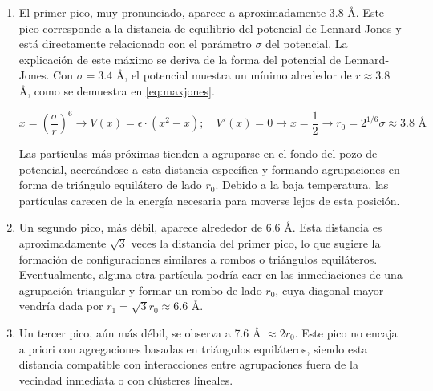 \begin{enumerate}
	
\item El primer pico, muy pronunciado, aparece a aproximadamente 3.8 Å. Este pico corresponde a la distancia de equilibrio del potencial de Lennard-Jones y está directamente relacionado con el parámetro $\sigma$ del potencial. La explicación de este máximo se deriva de la forma del potencial de Lennard-Jones. Con $\sigma=3.4$ Å, el potencial muestra un mínimo alrededor de $r \approx 3.8$ Å, como se demuestra en \ref{eq:maxjones}.
	
\begin{equation} \label{eq:maxjones}
		x = \left(\frac{\sigma}{r}\right)^{6} \rightarrow V(x) = \epsilon\cdot(x^2-x); \quad V'(x) = 0 \rightarrow x=\frac{1}{2} \rightarrow r_0=2^{1/6}\sigma \approx 3.8 \text{ Å}  
\end{equation}
	
Las partículas más próximas tienden a agruparse en el fondo del pozo de potencial, acercándose a esta distancia específica y formando agrupaciones en forma de triángulo equilátero de lado $r_0$. Debido a la baja temperatura, las partículas carecen de la energía necesaria para moverse lejos de esta posición.
	
\item Un segundo pico, más débil, aparece alrededor de 6.6 Å. Esta distancia es aproximadamente $\sqrt{3}$ veces la distancia del primer pico, lo que sugiere la formación de configuraciones similares a rombos o triángulos equiláteros. Eventualmente, alguna otra partícula podría caer en las inmediaciones de una agrupación triangular y formar un rombo de lado $r_0$, cuya diagonal mayor vendría dada por $r_1=\sqrt{3}r_0\approx 6.6$ Å.
	
\item Un tercer pico, aún más débil, se observa a 7.6 Å $\approx 2r_0$. Este pico no encaja a priori con agregaciones basadas en triángulos equiláteros, siendo esta distancia compatible con interacciones entre agrupaciones fuera de la vecindad inmediata o con clústeres lineales.
	
\end{enumerate}

